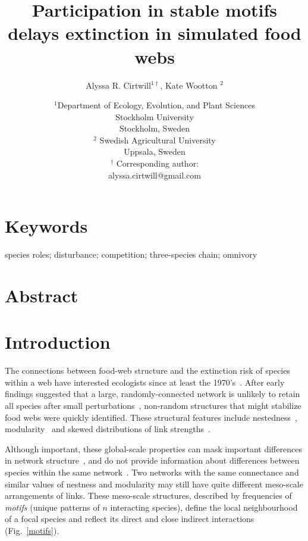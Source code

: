 \documentclass[12pt]{article}
\title{Participation in stable motifs delays extinction in simulated food webs}
\author{Alyssa R. Cirtwill$^{1\dagger}$, Kate Wootton $^{2}$}
\date{\small$^1$Department of Ecology, Evolution, and Plant Sciences\\ 
Stockholm University\\
Stockholm, Sweden\\
\medskip
\small$^2$ Swedish Agricultural University\\
Uppsala, Sweden\\
\medskip
$^\dagger$ Corresponding author:\\
alyssa.cirtwill@gmail.com\\
 }
\begin{document}
 
\maketitle 
\raggedright
\setlength{\parindent}{15pt} 


\section{Keywords}

  species roles; disturbance; competition; three-species chain; omnivory


\section{Abstract}


\section{Introduction}

  The connections between food-web structure and the extinction risk of species within a web have interested ecologists since at least the 1970's~\citep{May1972}. After early findings suggested that a large, randomly-connected network is unlikely to retain all species after small perturbations~\citep{Gardner1970,May1972}, non-random structures that might stabilize food webs were quickly identified. These structural features include nestedness~\citep{Allesina2012,Sauve2014}, modularity~\citep{Sauve2014,Thebault2010} and skewed distributions of link strengths~\citep{McCann1998,Gross2009,Rooney2012,Wootton2016}.
  
  
  Although important, these global-scale properties can mask important differences in  network structure~\citep{Simmons2019}, and do not provide information about differences between species within the same network~\citep{Cirtwill2018FoodWebs}. 
  Two networks with the same connectance and similar values of nestness and modularity may still have quite different meso-scale arrangements of links. 
  These meso-scale structures, described by frequencies of \emph{motifs} (unique patterns of $n$ interacting species), define the local neighbourhood of a focal species and reflect its direct and close indirect interactions (Fig.~\ref{motifs}).
  
\end{document}
